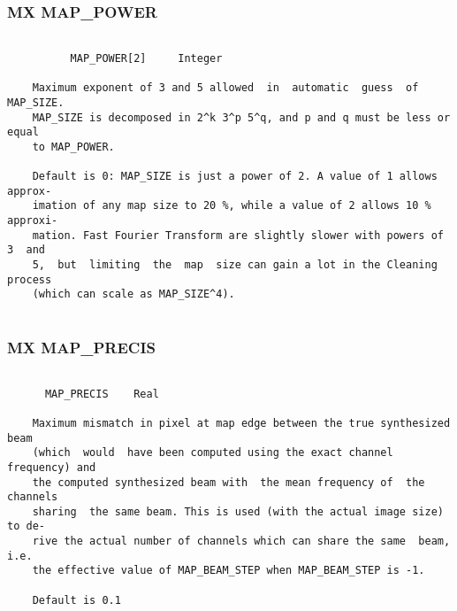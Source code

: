 \subsubsection{MX MAP\_POWER}
\begin{verbatim}

          MAP_POWER[2]     Integer

    Maximum exponent of 3 and 5 allowed  in  automatic  guess  of  MAP_SIZE.
    MAP_SIZE is decomposed in 2^k 3^p 5^q, and p and q must be less or equal
    to MAP_POWER.

    Default is 0: MAP_SIZE is just a power of 2. A value of 1 allows approx-
    imation of any map size to 20 %, while a value of 2 allows 10 % approxi-
    mation. Fast Fourier Transform are slightly slower with powers of 3  and
    5,  but  limiting  the  map  size can gain a lot in the Cleaning process
    (which can scale as MAP_SIZE^4).


\end{verbatim}
\subsubsection{MX MAP\_PRECIS}
\begin{verbatim}

      MAP_PRECIS    Real

    Maximum mismatch in pixel at map edge between the true synthesized  beam
    (which  would  have been computed using the exact channel frequency) and
    the computed synthesized beam with  the mean frequency of  the  channels
    sharing  the same beam. This is used (with the actual image size) to de-
    rive the actual number of channels which can share the same  beam,  i.e.
    the effective value of MAP_BEAM_STEP when MAP_BEAM_STEP is -1.

    Default is 0.1

\end{verbatim}
